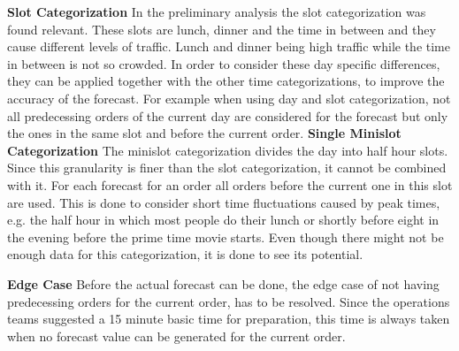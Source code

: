 \newline\newline\textbf{Slot Categorization}\newline
In the preliminary analysis the slot categorization was found relevant. These slots are lunch, dinner and the time in between and they cause different levels of traffic. Lunch and dinner being high traffic while the time in between is not so crowded. In order to consider these day specific differences, they can be applied together with the other time categorizations, to improve the accuracy of the forecast. For example when using day and slot categorization, not all predecessing orders of the current day are considered for the forecast but only the ones in the same slot and before the current order.
\newline\newline\textbf{Single Minislot Categorization}\newline
The minislot categorization divides the day into half hour slots. Since this granularity is finer than the slot categorization, it cannot be combined with it. For each forecast for an order all orders before the current one in this slot are used. This is done to consider short time fluctuations caused by peak times, e.g. the half hour in which most people do their lunch or shortly before eight in the evening before the prime time movie starts.\newline
Even though there might not be enough data for this categorization, it is done to see its potential.

\newline\newline\textbf{Edge Case}\newline
Before the actual forecast can be done, the edge case of not having predecessing orders for the current order, has to be resolved. Since the operations teams suggested a 15 minute basic time for preparation, this time is always taken when no forecast value can be generated for the current order.
